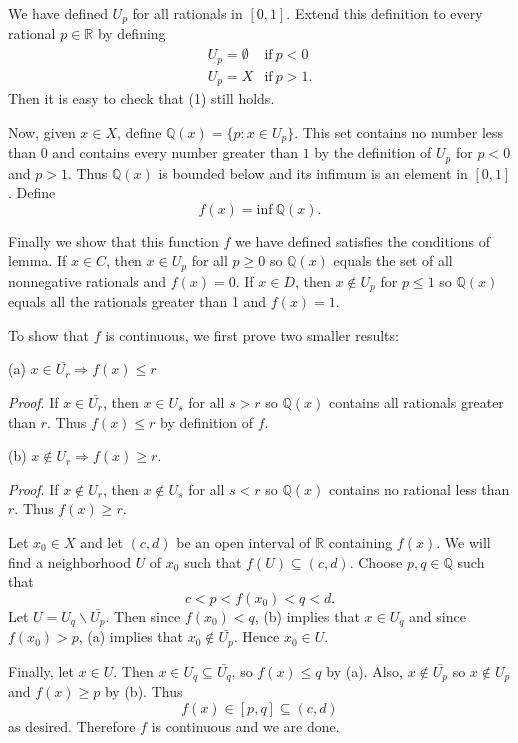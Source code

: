 \documentclass[12pt]{article}
\begin{document}
We have defined $U_p$ for all rationals in $[0,1]$. Extend this
definition to every rational $p \in \mathbb{R}$ by defining
\begin{displaymath}
	\begin{array}{ll}
		U_p = \emptyset & \textrm{if} \ p < 0 \\
		U_p = X & \textrm{if} \ p > 1.
	\end{array}
\end{displaymath}
Then it is easy to check that (1) still holds.

Now, given $x \in X$, define $\mathbb{Q}(x) = \{p : x \in U_p\}$. This
set contains no number less than $0$ and contains every number greater
than $1$ by the definition of $U_p$ for $p < 0$ and $p > 1$. Thus
$\mathbb{Q}(x)$ is bounded below and its infimum is an element in
$[0,1]$. Define
\begin{displaymath}
	f(x) = \textrm{inf} \ \mathbb{Q}(x).
\end{displaymath}

Finally we show that this function $f$ we have defined satisfies the
conditions of lemma.  If $x \in C$, then $x \in U_p$ for all $p \ge 0$
so $\mathbb{Q}(x)$ equals the set of all nonnegative rationals and
$f(x) = 0$. If $x \in D$, then $x \notin U_p$ for $p \le 1$ so
$\mathbb{Q}(x)$ equals all the rationals greater than 1 and $f(x) =
1$. 

To show that $f$ is continuous, we first prove two smaller results:

\indent (a) $x \in \bar{U_r} \Rightarrow f(x) \le r$

\emph{Proof}. If $x \in \bar{U_r}$, then $x \in U_s$ for all $s > r$
so $\mathbb{Q}(x)$ contains all rationals greater than $r$. Thus $f(x)
\le r$ by definition of $f$.

\indent (b) $x \notin U_r \Rightarrow f(x) \ge r$.

\emph{Proof}. If $x \notin U_r$, then $x \notin U_s$ for all $s < r$
so $\mathbb{Q}(x)$ contains no rational less than $r$. Thus $f(x) \ge
r$.

Let $x_0 \in X$ and let $(c,d)$ be an open interval of $\mathbb{R}$
containing $f(x)$.  We will find a neighborhood $U$ of $x_0$ such that
$f(U) \subseteq (c,d)$. Choose $p,q \in \mathbb{Q}$ such that
\begin{displaymath}
	c < p < f(x_0) < q < d.
\end{displaymath}
Let $U = U_q \backslash \bar{U_p}$. Then since $f(x_0) < q$, (b)
implies that $x \in U_q$ and since $f(x_0) > p$, (a) implies that $x_0
\notin \bar{U_p}$. Hence $x_0 \in U$.

Finally, let $x \in U$. Then $x \in U_q \subseteq \bar{U_q}$, so $f(x)
\le q$ by (a).  Also, $x \notin \bar{U_p}$ so $x \notin U_p$ and $f(x)
\ge p$ by (b). Thus
\begin{displaymath}
	f(x) \in [p,q] \subseteq (c,d)
\end{displaymath}
as desired. Therefore $f$ is continuous and we are done.
\end{document}
